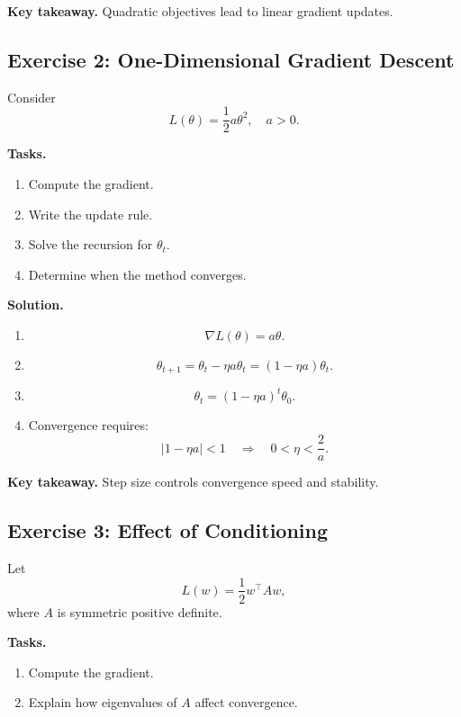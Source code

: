 \medskip

\noindent
\textbf{Key takeaway.}  
Quadratic objectives lead to linear gradient updates.

\subsection{Exercise 2: One-Dimensional Gradient Descent}

Consider
\[
L(\theta) = \frac{1}{2} a \theta^2, \quad a > 0.
\]

\medskip

\noindent
\textbf{Tasks.}
\begin{enumerate}
    \item Compute the gradient.
    \item Write the update rule.
    \item Solve the recursion for $\theta_t$.
    \item Determine when the method converges.
\end{enumerate}

\medskip

\noindent
\textbf{Solution.}

\begin{enumerate}
\item 
\[
\nabla L(\theta) = a\theta.
\]

\item 
\[
\theta_{t+1} = \theta_t - \eta a \theta_t = (1 - \eta a)\theta_t.
\]

\item 
\[
\theta_t = (1 - \eta a)^t \theta_0.
\]

\item Convergence requires:
\[
|1 - \eta a| < 1 \quad \Rightarrow \quad 0 < \eta < \frac{2}{a}.
\]
\end{enumerate}

\medskip

\noindent
\textbf{Key takeaway.}  
Step size controls convergence speed and stability.

\subsection{Exercise 3: Effect of Conditioning}

Let
\[
L(w) = \frac{1}{2} w^\top A w,
\]
where $A$ is symmetric positive definite.

\medskip

\noindent
\textbf{Tasks.}
\begin{enumerate}
    \item Compute the gradient.
    \item Explain how eigenvalues of $A$ affect convergence.
\end{enumerate}

